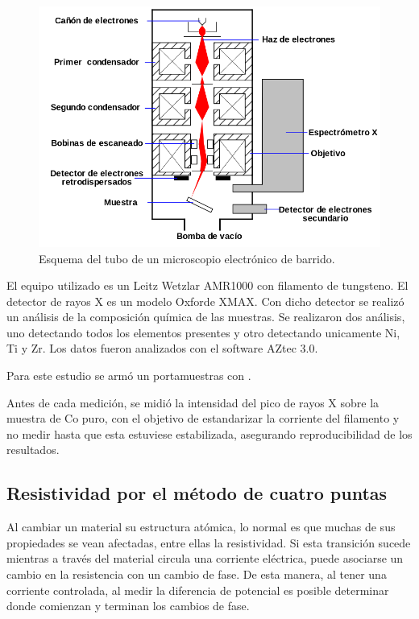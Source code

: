 \documentclass[12pt]{article}
\theoremstyle{definition}
\theoremstyle{remark}
\begin{document}
 \begin{figure}[H]
 	\centering
	\includegraphics[scale=0.5]{img/SEM.png}
 	\caption{Esquema del tubo de un microscopio electrónico de barrido.}
	\label{SEM}
\end{figure} 

El equipo utilizado es un Leitz Wetzlar AMR1000 con filamento de tungsteno. El detector de rayos X es un modelo Oxforde XMAX. Con dicho detector se realizó un análisis de la composición química de las muestras. Se realizaron dos análisis, uno detectando todos los elementos presentes y otro detectando unicamente Ni, Ti y Zr. Los datos fueron analizados con el software AZtec 3.0.

Para este estudio se armó un portamuestras con .

Antes de cada medición, se midió la intensidad del pico de rayos X sobre la muestra de Co puro, con el objetivo de estandarizar la corriente del filamento y no medir hasta que esta estuviese estabilizada, asegurando reproducibilidad de los resultados.

\subsection{Resistividad por el método de cuatro puntas}
Al cambiar un material su estructura atómica, lo normal es que muchas de sus propiedades se vean afectadas, entre ellas la resistividad. Si esta transición sucede mientras a través del material circula una corriente eléctrica, puede asociarse un cambio en la resistencia con un cambio de fase. De esta manera, al tener una corriente controlada, al medir la diferencia de potencial es posible determinar donde comienzan y terminan los cambios de fase.
\end{document}

